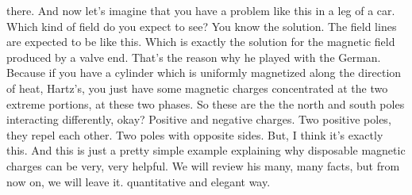 there. And now let's imagine that you have a problem like this in a leg of a car. Which kind of field do you expect to see? You know the solution. The field lines are expected to be like this. Which is exactly the solution for the magnetic field produced by a valve end. That's the reason why he played with the German. Because if you have a cylinder which is uniformly magnetized along the direction of heat, Hartz's, you just have some magnetic charges concentrated at the two extreme portions, at these two phases. So these are the the north and south poles interacting differently, okay? Positive and negative charges. Two positive poles, they repel each other. Two poles with opposite sides. But, I think it's exactly this. And this is just a pretty simple example explaining why disposable magnetic charges can be very, very helpful. We will review his many, many facts, but from now on, we will leave it. quantitative and elegant way.
